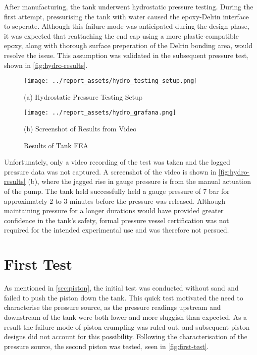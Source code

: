 After manufacturing, the tank underwent hydrostatic pressure testing. During the first attempt, pressurising the tank with water caused the epoxy-Delrin interface to seperate. Although this failure mode was anticipated during the design phase, it was expected that reattaching the end cap using a more plastic-compatible epoxy, along with thorough surface preperation of the Delrin bonding area, would resolve the issue. This assumption was validated in the subsequent pressure test, shown in \autoref{fig:hydro-results}.
\begin{figure}[htbp]
    \centering

    \begin{minipage}{0.45\textwidth}
        \centering
        \texttt{[image: ../report\_assets/hydro\_testing\_setup.png]}
        \caption*{(a) Hydrostatic Pressure Testing Setup}
    \end{minipage}    
    \hfill
    \begin{minipage}{0.45\textwidth}
        \centering
        \texttt{[image: ../report\_assets/hydro\_grafana.png]}
        \caption*{(b) Screenshot of Results from Video}
    \end{minipage}    
    \caption{Results of Tank FEA}\label{fig:hydro-results}

\end{figure}  
Unfortunately, only a video recording of the test was taken and the logged pressure data was not captured. A screenshot of the video is shown in \autoref{fig:hydro-results} (b), where the jagged rise in gauge pressure is from the manual actuation of the pump. The tank held successfully held a gauge pressure of 7 bar for approximately 2 to 3 minutes before the pressure was released. Although maintaining pressure for a longer durations would have provided greater confidence in the tank's safety, formal pressure vessel certification was not required for the intended experimental use and was therefore not persued.

\section{First Test}\label{sec:first-test}
As mentioned in \autoref{sec:piston}, the initial test was conducted without sand and failed to push the piston down the tank. This quick test motivated the need to characterise the pressure source, as the pressure readings upstream and downstream of the tank were both lower and more sluggish than expected. As a result the failure mode of piston crumpling was ruled out, and subsequent piston designs did not account for this possibility. Following the characterisation of the pressure source, the second piston was tested, seen in \autoref{fig:first-test}. 

